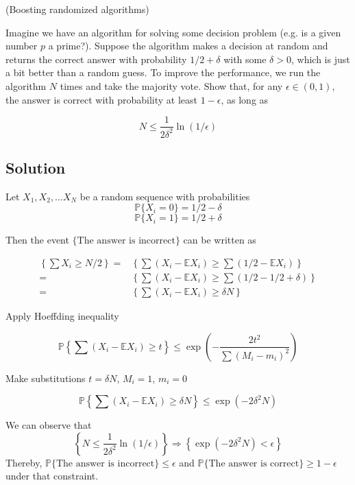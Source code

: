 \documentclass{article}
\begin{document}
(Boosting randomized algorithms)

Imagine we have an algorithm for solving some decision problem (e.g. is a given number $p$ a prime?). Suppose the algorithm makes a decision at random and returns the correct answer with probability $1/2 + \delta$ with some $\delta > 0$, which is just a bit better than a random guess. To improve the performance, we run the algorithm $N$ times and take the majority vote. Show that, for any $\epsilon \in (0, 1)$, the answer is correct with probability at least $1 - \epsilon$, as long as

$$N \leq \frac{1}{2\delta^2}\ln(1/\epsilon)$$

\subsection{Solution}

Let $X_1, X_2, \dots X_N$ be a random sequence with probabilities $$\mathbb P \{X_i = 0\} = 1/2 - \delta$$ $$\mathbb P \{X_i = 1\} = 1/2 + \delta$$

Then the event $\{\text{The answer is incorrect}\}$ can be written as 

\begin{equation*}
    \begin{aligned}
    \left\{ \sum X_i \geq N/2 \right\} = & \left\{ \sum (X_i - \mathbb E X_i) \geq \sum (1/2 - \mathbb E X_i) \right\} \\
    = & \left\{ \sum (X_i - \mathbb E X_i) \geq \sum (1/2 - 1/2 + \delta) \right\} \\
    = & \left\{ \sum (X_i - \mathbb E X_i) \geq \delta N \right\}
    \end{aligned}
\end{equation*}

Apply Hoeffding inequality

$$\mathbb P \left\{ \sum ( X_i -  \mathbb E X_i) \geq t \right\} \leq \exp\left(-\frac{2t^2}{\sum (M_i - m_i)^2}\right)$$

Make substitutions $t = \delta N$, $M_i = 1$, $m_i = 0$

$$\mathbb P \left\{ \sum (X_i - \mathbb E X_i) \geq \delta N \right\} \leq \exp(-2\delta^2 N)$$

We can observe that 
$$\left\{N \leq \frac{1}{2\delta^2}\ln(1/\epsilon)\right\} \Rightarrow \left\{\exp(-2\delta^2 N) < \epsilon\right\}$$
Thereby, $\mathbb P \{\text{The answer is incorrect}\} \leq \epsilon$ and $\mathbb P \{\text{The answer is correct}\} \geq 1 - \epsilon$ under that constraint.
\end{document}
